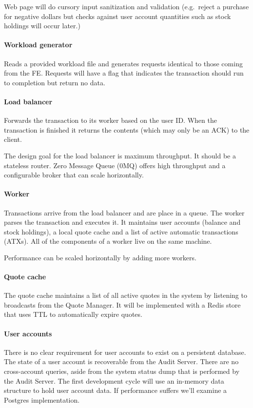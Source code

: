 Web page will do cursory input sanitization and validation (e.g.\ reject a purchase for negative dollars but checks against user account quantities such as stock holdings will occur later.)

\paragraph{Workload generator}
Reads a provided workload file and generates requests identical to those coming from the FE.
Requests will have a flag that indicates the transaction should run to completion but return no data.

\paragraph{Load balancer}
Forwards the transaction to its worker based on the user ID.
When the transaction is finished it returns the contents (which may only be an ACK) to the client.

The design goal for the load balancer is maximum throughput.
It should be a stateless router.
Zero Message Queue (0MQ) offers high throughput and a configurable broker that can scale horizontally.

\paragraph{Worker}
Transactions arrive from the load balancer and are place in a queue.
The worker parses the transaction and executes it.
It maintains user accounts (balance and stock holdings), a local quote cache and a list of active automatic transactions (ATXs).
All of the components of a worker live on the same machine.

Performance can be scaled horizontally by adding more workers.

\paragraph{Quote cache}
The quote cache maintains a list of all active quotes in the system by listening to broadcasts from the Quote Manager.
It will be implemented with a Redis store that uses TTL to automatically expire quotes.

\paragraph{User accounts}
There is no clear requirement for user accounts to exist on a persistent database.
The state of a user account is recoverable from the Audit Server.
There are no cross-account queries, aside from the system status dump that is performed by the Audit Server.
The first development cycle will use an in-memory data structure to hold user account data.
If performance suffers we'll examine a Postgres implementation.

